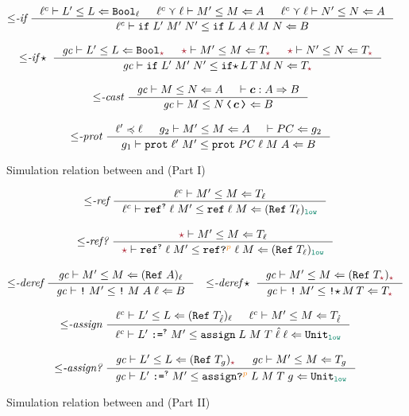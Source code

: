 \begin{figure}[tbp]
\begin{gather*}
    \\[2ex]
    {\leq}\textit{-if}~
    \inference{\simrel{\ell^c}{L'}{L}{\Bool_\ell} & \simrel{\ell^c \curlyvee \ell}{M'}{M}{A} & \simrel{\ell^c \curlyvee \ell}{N'}{N}{A}}
              {\simrel{\ell^c}{\dynif{L'}{M'}{N'}}{\ccif{L}{A}{\ell}{M}{N}}{B}}
    \\[2ex]
    {\leq}\textit{-if}\star~
    \inference{\simrel{\gc}{L'}{L}{\Bool_{\unk}} & \simrel{\unk}{M'}{M}{T_{\unk}} & \simrel{\unk}{N'}{N}{T_{\unk}}}
              {\simrel{\gc}{\dynif{L'}{M'}{N'}}{\ccifstar{L}{T}{M}{N}}{T_{\unk}}}
    \\[2ex]
    {\leq}\textit{-cast}~
    \inference{\simrel{\gc}{M}{N}{A} & \vdash \bm{c} : A \Rightarrow B}
              {\simrel{\gc}{M}{\cccast{N}{\bm{c}}}{B}}
    \\[2ex]
    {\leq}\textit{-prot}~
    \inference{\ell' \preccurlyeq \ell & g_2 \vdash M' \leq M \Leftarrow A & \vdash PC \Leftarrow g_2}
    {g_1 \vdash \dynprot{\ell'}{M'} \leq \ccprot{\PC}{\ell}{M}{A} \Leftarrow B}
  \end{gather*}
  \caption{Simulation relation between \CC and \DynIFC (Part I)}
  \label{fig:sim-rel-1}
\end{figure}

\begin{figure}[tbp]
  \raggedright
  \small
  \begin{gather*}
    {\leq}\textit{-ref}~
    \inference{\simrel{\ell^c}{M'}{M}{T_\ell}}
              {\simrel{\ell^c}{\dynref{?}{\ell}{M'}}{\ccref{\ell}{M}}{(\Refer{T_\ell})_{\low}}}
    \\[2ex]
    {\leq}\textit{-ref?}~
    \inference{\simrel{\unk}{M'}{M}{T_\ell}}
              {\simrel{\unk}{\dynref{?}{\ell}{M'}}{\ccrefproj{\ell}{M}{p}}{(\Refer{T_\ell})_{\low}}}
    \\[2ex]
    {\leq}\textit{-deref}~
    \inference{\simrel{\gc}{M'}{M}{(\Refer{A})_\ell}}
              {\simrel{\gc}{\dynderef{M'}}{\ccderef{M}{A}{\ell}}{B}}
    \quad
    {\leq}\textit{-deref}\star~
    \inference{\simrel{\gc}{M'}{M}{(\Refer{T_{\unk}})_{\unk}}}
              {\simrel{\gc}{\dynderef{M'}}{\ccderefstar{M}{T}}{T_{\unk}}}
    \\[2ex]
    {\leq}\textit{-assign}~
    \inference{\simrel{\ell^c}{L'}{L}{(\Refer{T_{\hat{\ell}}})_{\ell}} & \simrel{\ell^c}{M'}{M}{T_{\hat{\ell}}}}
              {\simrel{\ell^c}{\dynassign{L'}{?}{M'}}{\ccassign{L}{M}{T}{\hat{\ell}}{\ell}}{\Unit_{\low}}}
    \\[2ex]
    {\leq}\textit{-assign?}~
    \inference{\simrel{\gc}{L'}{L}{(\Refer{T_g})_{\unk}} & \simrel{\gc}{M'}{M}{T_g}}
              {\simrel{\gc}{\dynassign{L'}{?}{M'}}{\ccassignproj{L}{M}{T}{g}{p}}{\Unit_{\low}}}
  \end{gather*}
  \caption{Simulation relation between \CC and \DynIFC (Part II)}
  \label{fig:sim-rel-2}
\end{figure}

